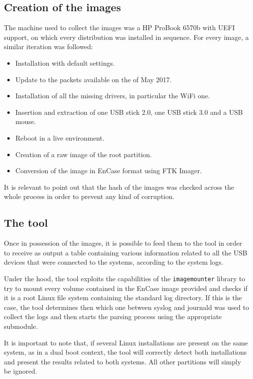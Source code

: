 \documentclass[a4paper,twocolumn]{article}
\begin{document}
\subsection{Creation of the images}
\label{sec:images}
The machine used to collect the images was a HP ProBook 6570b with UEFI
support, on which every distribution was installed in sequence. For every
image, a similar iteration was followed:
\begin{itemize}
\item Installation with default settings.
\item Update to the packets available on the  of May 2017.
\item Installation of all the missing drivers, in particular the WiFi one.
\item Insertion and extraction of one USB stick 2.0, one USB stick 3.0 and a USB
	mouse.
\item Reboot in a live environment.
\item Creation of a raw image of the root partition.
\item Conversion of the image in EnCase format using FTK Imager.
\end{itemize}
It is relevant to point out that the hash of the images was checked across the
whole process in order to prevent any kind of corruption.

\subsection{The tool}
\label{sec:tool}
Once in possession of the images, it is possible to feed them to the tool in
order to receive as output a table containing various information related to all
the USB devices that were connected to the systems, according to the system
logs.

Under the hood, the tool exploits the capabilities of the \texttt{imagemounter}
library to try to mount every volume contained in the EnCase image provided and
checks if it is a root Linux file system containing the standard log directory.
If this is the case, the tool determines then which one between syslog and
journald was used to collect the logs and then starts the parsing process using
the appropriate submodule.

It is important to note that, if several Linux installations are present on the
same system, as in a dual boot context, the tool will correctly detect both
installations and present the results related to both systems. All other
partitions will simply be ignored.
\end{document}

